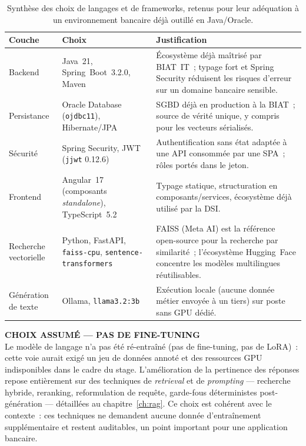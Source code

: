 ﻿\documentclass[12pt,a4paper]{report}
\newcommand{\code}[1]{\texttt{\color{biatbluedk}#1}}
\begin{document}
\begin{table}[h]
\centering
\small
\caption{Synthèse des choix de langages et de frameworks, retenus pour leur adéquation à un environnement bancaire déjà outillé en Java/Oracle.}
\begin{tabular}{@{}p{2.1cm}p{3.6cm}p{7cm}@{}}
\toprule
\textbf{Couche} & \textbf{Choix} & \textbf{Justification} \\
\midrule
Backend & Java~21, Spring~Boot~3.2.0, Maven & Écosystème déjà maîtrisé par BIAT~IT~; typage fort et Spring Security réduisent les risques d'erreur sur un domaine bancaire sensible. \\
Persistance & Oracle Database (\code{ojdbc11}), Hibernate/JPA & SGBD déjà en production à la BIAT~; source de vérité unique, y compris pour les vecteurs sérialisés. \\
Sécurité & Spring Security, JWT (\code{jjwt} 0.12.6) & Authentification sans état adaptée à une API consommée par une SPA~; rôles portés dans le jeton. \\
Frontend & Angular~17 (composants \emph{standalone}), TypeScript~5.2 & Typage statique, structuration en composants/services, écosystème déjà utilisé par la DSI. \\
Recherche vectorielle & Python, FastAPI, \code{faiss-cpu}, \code{sentence-transformers} & FAISS (Meta AI) est la référence open-source pour la recherche par similarité~; l'écosystème Hugging~Face concentre les modèles multilingues réutilisables. \\
Génération de texte & Ollama, \code{llama3.2:3b} & Exécution locale (aucune donnée métier envoyée à un tiers) sur poste sans GPU dédié. \\
\bottomrule
\end{tabular}
\end{table}

\begin{note}
\textbf{\color{biatcyan}\ttfamily\footnotesize CHOIX ASSUMÉ --- PAS DE FINE-TUNING}\\[4pt]
Le modèle de langage n'a pas été ré-entraîné (pas de fine-tuning, pas de LoRA)~: cette voie aurait exigé un jeu de données annoté et des ressources GPU indisponibles dans le cadre du stage. L'amélioration de la pertinence des réponses repose entièrement sur des techniques de \emph{retrieval} et de \emph{prompting} --- recherche hybride, reranking, reformulation de requête, garde-fous déterministes post-génération --- détaillées au chapitre~\ref{ch:rag}. Ce choix est cohérent avec le contexte~: ces techniques ne demandent aucune donnée d'entraînement supplémentaire et restent auditables, un point important pour une application bancaire.
\end{note}
\end{document}
